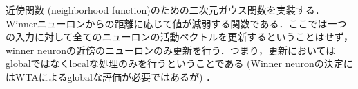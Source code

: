近傍関数 (neighborhood function)のための二次元ガウス関数を実装する．Winnerニューロンからの距離に応じて値が減弱する関数である．ここでは一つの入力に対して全てのニューロンの活動ベクトルを更新するということはせず，winner neuronの近傍のニューロンのみ更新を行う．つまり，更新においてはglobalではなくlocalな処理のみを行うということである  (Winner neuronの決定にはWTAによるglobalな評価が必要ではあるが) ．